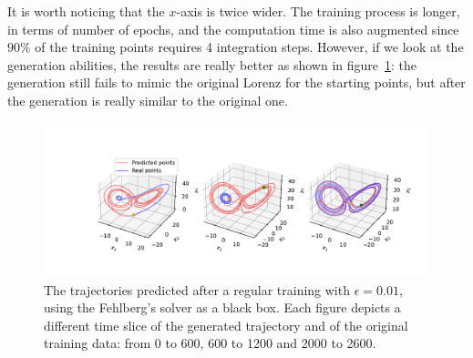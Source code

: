\documentclass{article}
\newcommand{\eps}{\ensuremath{\epsilon}}
\begin{document}
It is worth noticing that the $x$-axis is twice wider. The training
process is longer, in terms of number of epochs, and the computation
time is also augmented since $90\%$ of the training points requires 4
integration steps. However, if we look at the generation abilities,
the results are really better as shown in
figure~\ref{fig:baseline_lorenz_eps}: the generation still fails to
mimic the original Lorenz for the starting points, but after the
generation is really similar to the original one.
\begin{figure}[thb]
  \hspace*{-2cm}
  \includegraphics[width=1.2\textwidth]{./figs/batch_lorenz_eps_0.01_lorenz_3}
  \caption{The trajectories predicted after a regular training with $\eps=0.01$, using
    the Fehlberg's solver as a black box. Each figure depicts a
    different time slice of the generated trajectory and of the
    original training data: from 0 to 600, 600 to 1200 and 2000 to 2600. }
  \label{fig:baseline_lorenz_eps}
\end{figure}
\end{document}
